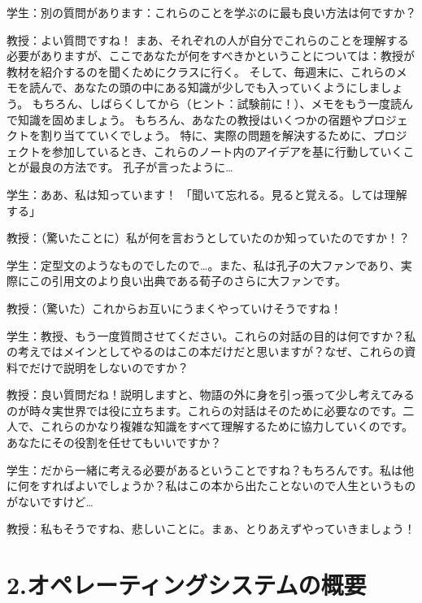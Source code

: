 学生：別の質問があります：これらのことを学ぶのに最も良い方法は何ですか？

教授：よい質問ですね！
まあ、それぞれの人が自分でこれらのことを理解する必要がありますが、ここであなたが何をすべきかということについては：教授が教材を紹介するのを聞くためにクラスに行く。
そして、毎週末に、これらのメモを読んで、あなたの頭の中にある知識が少しでも入っていくようにしましょう。
もちろん、しばらくしてから（ヒント：試験前に！）、メモをもう一度読んで知識を固めましょう。
もちろん、あなたの教授はいくつかの宿題やプロジェクトを割り当てていくでしょう。
特に、実際の問題を解決するために、プロジェクトを参加しているとき、これらのノート内のアイデアを基に行動していくことが最良の方法です。
孔子が言ったように\ldots{}

学生：ああ、私は知っています！
「聞いて忘れる。見ると覚える。しては理解する」

教授：（驚いたことに）私が何を言おうとしていたのか知っていたのですか！？

学生：定型文のようなものでしたので\ldots。また、私は孔子の大ファンであり、実際にこの引用文のより良い出典である荀子のさらに大ファンです。

教授：（驚いた）これからお互いにうまくやっていけそうですね！

学生：教授、もう一度質問させてください。これらの対話の目的は何ですか？私の考えではメインとしてやるのはこの本だけだと思いますが？なぜ、これらの資料でだけで説明をしないのですか？

教授：良い質問だね！説明しますと、物語の外に身を引っ張って少し考えてみるのが時々実世界では役に立ちます。これらの対話はそのために必要なのです。二人で、これらのかなり複雑な知識をすべて理解するために協力していくのです。あなたにその役割を任せてもいいですか？

学生：だから一緒に考える必要があるということですね？もちろんです。私は他に何をすればよいでしょうか？私はこの本から出たことないので人生というものがないですけど\ldots{}

教授：私もそうですね、悲しいことに。まぁ、とりあえずやっていきましょう！

\newpage

\hypertarget{ux30aaux30daux30ecux30fcux30c6ux30a3ux30f3ux30b0ux30b7ux30b9ux30c6ux30e0ux306eux6982ux8981}{%
\section*{2.オペレーティングシステムの概要}\label{ux30aaux30daux30ecux30fcux30c6ux30a3ux30f3ux30b0ux30b7ux30b9ux30c6ux30e0ux306eux6982ux8981}}

